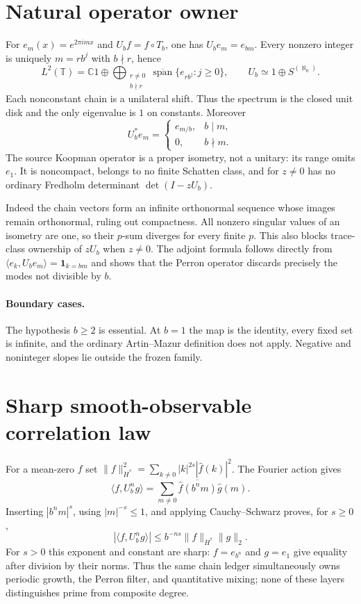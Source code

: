 \documentclass[10pt]{article}
\begin{document}
\section{Natural operator owner}
For $e_m(x)=e^{2\pi imx}$ and $U_bf=f\circ T_b$, one has $U_be_m=e_{bm}$.
Every nonzero integer is uniquely $m=rb^j$ with $b\nmid r$, hence
\[
L^2(\mathbb T)=\mathbb C1\oplus
\bigoplus_{\substack{r\ne0\\b\nmid r}}
\overline{\operatorname{span}}\{e_{rb^j}:j\ge0\},
\qquad U_b\simeq1\oplus S^{(\aleph_0)}.
\]
Each nonconstant chain is a unilateral shift.  Thus the spectrum is the
closed unit disk and the only eigenvalue is $1$ on constants.  Moreover
\[
U_b^*e_m=\begin{cases}e_{m/b},&b\mid m,\\0,&b\nmid m.\end{cases}
\]
The source Koopman operator is a proper isometry, not a unitary: its range
omits $e_1$.  It is noncompact, belongs to no finite Schatten class, and for
$z\ne0$ has no ordinary Fredholm determinant $\det(I-zU_b)$.

Indeed the chain vectors form an infinite orthonormal sequence whose images
remain orthonormal, ruling out compactness.  All nonzero singular values of
an isometry are one, so their $p$-sum diverges for every finite $p$.  This
also blocks trace-class ownership of $zU_b$ when $z\ne0$.  The adjoint formula
follows directly from $\langle e_k,U_be_m\rangle=\mathbf1_{k=bm}$ and shows
that the Perron operator discards precisely the modes not divisible by $b$.

\paragraph{Boundary cases.}
The hypothesis $b\ge2$ is essential.  At $b=1$ the map is the identity,
every fixed set is infinite, and the ordinary Artin--Mazur definition does
not apply.  Negative and noninteger slopes lie outside the frozen family.

\section{Sharp smooth-observable correlation law}
For a mean-zero $f$ set
$\|f\|_{\dot H^s}^2=\sum_{k\ne0}|k|^{2s}|\widehat f(k)|^2$.
The Fourier action gives
\[
 \langle f,U_b^ng\rangle
 =\sum_{m\ne0}\overline{\widehat f(b^nm)}\widehat g(m).
\]
Inserting $|b^nm|^s$, using $|m|^{-s}\le1$, and applying
Cauchy--Schwarz proves, for $s\ge0$,
\[
 |\langle f,U_b^ng\rangle|
 \le b^{-ns}\|f\|_{\dot H^s}\|g\|_2.
\]
For $s>0$ this exponent and constant are sharp: $f=e_{b^n}$ and $g=e_1$
give equality after division by their norms.  Thus the same chain ledger
simultaneously owns periodic growth, the Perron filter, and quantitative
mixing; none of these layers distinguishes prime from composite degree.
\end{document}
